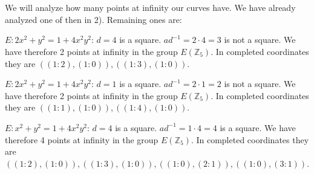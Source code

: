 \documentclass[12pt, a4paper]{article}
\begin{document}
\section{}
We will analyze how many points at infinity our curves have. We have already analyzed one of then in 2). Remaining ones are:

$E: 2x^2+y^2=1+4x^2y^2$: $d=4$ is a square. $ad^{-1} = 2\cdot 4 = 3$ is not a square. We have therefore 2 points at infinity in the group $E(\mathbb{Z}_5)$. In completed coordinates they are $((1:2), (1:0)), ((1:3),(1:0))$.

$E: 2x^2+y^2=1+4x^2y^2$: $d=1$ is a square. $ad^{-1} = 2\cdot 1 = 2$ is not a square. We have therefore 2 points at infinity in the group $E(\mathbb{Z}_5)$. In completed coordinates they are $((1:1), (1:0)), ((1:4),(1:0))$.

$E:x^2+y^2=1+4x^2y^2$: $d=4$ is a square. $ad^{-1} = 1\cdot 4 = 4$ is a square. We have therefore 4 points at infinity in the group $E(\mathbb{Z}_5)$. In completed coordinates they are $((1:2), (1:0)), ((1:3),(1:0)), ((1:0), (2:1)), ((1:0), (3:1))$.
\end{document}

